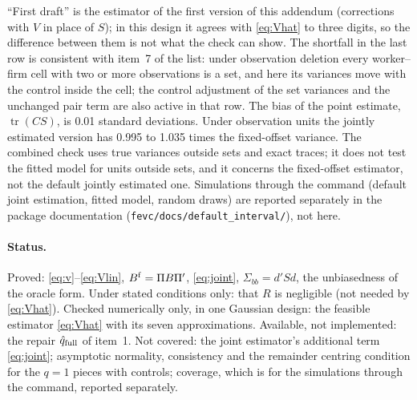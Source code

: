 \documentclass[11pt]{article}
\newcommand{\tr}{\operatorname{tr}}
\begin{document}
\begin{center}\small
{}
\end{center}
``First draft'' is the estimator of the first version of this addendum (corrections with $V$ in place of $S$); in
this design it agrees with \eqref{eq:Vhat} to three digits, so the difference between them is not what the check
can show. The shortfall in the last row is consistent with item~7 of the list: under observation deletion every
worker--firm cell with two or more observations is a set, and here its variances move with the control inside the
cell; the control adjustment of the set variances and the unchanged pair term are also active in that row. The bias
of the point estimate, $\tr(CS)$, is 0.01 standard deviations. Under observation units the jointly estimated version
has 0.995 to 1.035 times the fixed-offset variance. The combined check uses true variances outside sets and exact
traces; it does not test the fitted model for units outside sets, and it concerns the fixed-offset estimator, not
the default jointly estimated one. Simulations through the command (default joint estimation, fitted model, random
draws) are reported separately in the package documentation (\texttt{fevc/docs/default\_interval/}), not here.

\paragraph{Status.} Proved: \eqref{eq:v}--\eqref{eq:Vlin}, $B^{\rm f}=\Pi B\Pi'$, \eqref{eq:joint}, $\Sigma_{bb}=d'Sd$,
the unbiasedness of the oracle form. Under stated conditions only: that $R$ is negligible (not needed by
\eqref{eq:Vhat}). Checked numerically only, in one Gaussian design: the feasible estimator \eqref{eq:Vhat} with its seven
approximations. Available, not implemented: the repair $\hat q_{\rm full}$ of item~1. Not covered: the joint
estimator's additional term \eqref{eq:joint}; asymptotic normality, consistency and the remainder centring condition
for the $q=1$ pieces with controls; coverage, which is for the simulations through the command, reported separately.
\end{document}
